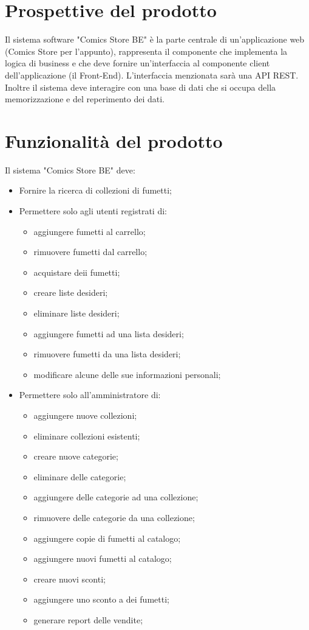 \documentclass{scrreprt}
\begin{document}
\section{Prospettive del prodotto}
Il sistema software "Comics Store BE" è la parte centrale di un'applicazione web (Comics Store per l'appunto),
rappresenta il componente che implementa la logica di business e che deve fornire un'interfaccia al componente client
dell'applicazione (il Front-End). L'interfaccia menzionata sarà una API REST.
Inoltre il sistema deve interagire con una base di dati che si occupa della memorizzazione e del reperimento dei dati.

\section{Funzionalità del prodotto}
Il sistema "Comics Store BE" deve:
\begin{itemize}
    \item Fornire la ricerca di collezioni di fumetti;
    \item Permettere solo agli utenti registrati di:
        \begin{itemize}
            \item aggiungere fumetti al carrello;
            \item rimuovere fumetti dal carrello;
            \item acquistare deii fumetti;
            \item creare liste desideri;
            \item eliminare liste desideri;
            \item aggiungere fumetti ad una lista desideri;
            \item rimuovere fumetti da una lista desideri;
            \item modificare alcune delle sue informazioni personali;
        \end{itemize}
    \item Permettere solo all'amministratore di:
        \begin{itemize}
            \item aggiungere nuove collezioni;
            \item eliminare collezioni esistenti;
            \item creare nuove categorie;
            \item eliminare delle categorie;
            \item aggiungere delle categorie ad una collezione;
            \item rimuovere delle categorie da una collezione;
            \item aggiungere copie di fumetti al catalogo;
            \item aggiungere nuovi fumetti al catalogo;
            \item creare nuovi sconti;
            \item aggiungere uno sconto a dei fumetti;
            \item generare report delle vendite;
        \end{itemize}
\end{itemize}
\end{document}
